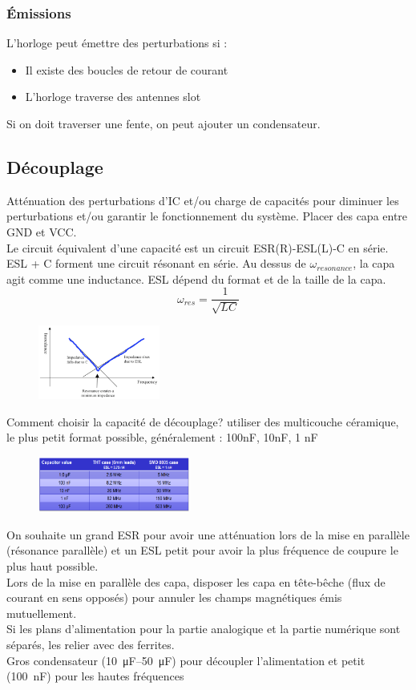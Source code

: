 \documentclass[resume]{subfiles}
\begin{document}
\begin{multicols}{3}
\subsubsection{Émissions}
L'horloge peut émettre des perturbations si :
\begin{itemize}
\item Il existe des boucles de retour de courant
\item L'horloge traverse des antennes slot
\end{itemize}
Si on doit traverser une fente, on peut ajouter un condensateur.


\subsection{Découplage}
Atténuation des perturbations d'IC et/ou charge de capacités pour diminuer les perturbations et/ou garantir le fonctionnement du système. Placer des capa entre GND et VCC.\\
Le circuit équivalent d'une capacité est un circuit ESR(R)-ESL(L)-C en série. ESL + C forment une circuit résonant en série. Au dessus de $\omega_{resonance}$, la capa agit comme une inductance. ESL dépend du format et de la taille de la capa.\\
$$\omega_{res}=\frac{1}{\sqrt{LC}}$$
\begin{figure}[H]
\centering
\includegraphics[width=4.00cm]{img_7.png}
\end{figure}
Comment choisir la capacité de découplage? utiliser des multicouche céramique, le plus petit format possible, généralement : 100nF, 10nF, 1 nF\\
\begin{figure}[H]
\centering
\includegraphics[width=5.00cm]{img_8.png}
\end{figure}
On souhaite un grand ESR pour avoir une atténuation lors de la mise en parallèle (résonance parallèle) et un ESL petit pour avoir la plus fréquence de coupure le plus haut possible.\\
Lors de la mise en parallèle des capa, disposer les capa en tête-bêche (flux de courant en sens opposés) pour annuler les champs magnétiques émis mutuellement.\\
Si les plans d'alimentation pour la partie analogique et la partie numérique sont séparés, les relier avec des ferrites.\\
Gros condensateur (\SIrange{10}{50}{\micro\farad}) pour découpler l'alimentation et petit (\SI{100}{\nano\farad}) pour les hautes fréquences

\end{multicols}
\end{document}

